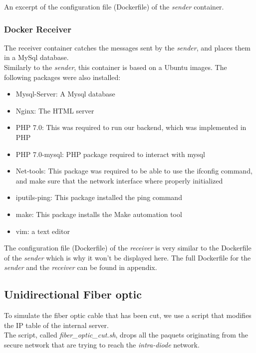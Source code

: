 \documentclass[a4paper,11pt]{article}
\begin{document}
\begin{table}

\caption{An excerpt of the configuration file (Dockerfile) of the \textit{sender} container.}
\end{table}

\subsubsection{Docker Receiver}
The receiver container catches the messages sent by the \textit{sender}, and places them in a MySql database.\\

Similarly to the \textit{sender}, this container is based on a Ubuntu images. The following packages were also installed:

\begin{itemize}
	\item{Mysql-Server: A Mysql database}
	\item{Nginx: The HTML server}
	\item{PHP 7.0: This was required to run our backend, which was implemented in PHP}
	\item{PHP 7.0-mysql: PHP package required to interact with mysql}
	\item{Net-tools: This package was required to be able to use the ifconfig command, and make sure that the network interface where properly initialized}
	\item{iputils-ping: This package installed the ping command}
	\item{make: This package installs the Make automation tool}
	\item{vim: a text editor}
\end{itemize}

The configuration file (Dockerfile) of the \textit{receiver} is very similar to the Dockerfile of the \textit{sender} which is why it won't be displayed here. The full Dockerfile for the \textit{sender} and the \textit{receiver} can be found in appendix.

\subsection{Unidirectional Fiber optic}
\label{sec:unidirectional}
To simulate the fiber optic cable that has been cut, we use a script that modifies the IP table of the internal server.\\

The script, called \textit{fiber\_optic\_cut.sh}, drops all the paquets originating from the secure network that are trying to reach the \textit{intra-diode} network.\\
\end{document}
